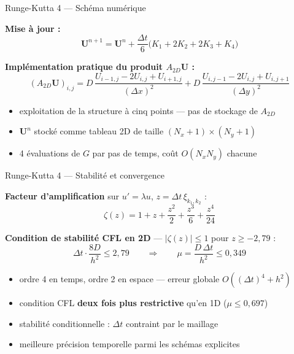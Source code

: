 \documentclass[10pt]{beamer}
\begin{document}
\begin{frame}{Runge-Kutta 4 — Schéma numérique}

\textbf{Mise à jour :}
\begin{equation}
  \boxed{\mathbf{U}^{n+1} = \mathbf{U}^n
    + \frac{\Delta t}{6}\bigl(K_1 + 2K_2 + 2K_3 + K_4\bigr)}
\end{equation}

\bigskip

\textbf{Implémentation pratique du produit $A_{2D}\mathbf{U}$ :}
\begin{equation}
  (A_{2D}\mathbf{U})_{i,j} =
  D\,\frac{U_{i-1,j} - 2U_{i,j} + U_{i+1,j}}{(\Delta x)^2}
  + D\,\frac{U_{i,j-1} - 2U_{i,j} + U_{i,j+1}}{(\Delta y)^2}
\end{equation}

\medskip

\begin{itemize}
  \item exploitation de la structure à cinq points — pas de stockage de $A_{2D}$
  \item $\mathbf{U}^n$ stocké comme tableau 2D de taille $(N_x{+}1)\times(N_y{+}1)$
  \item 4 évaluations de $G$ par pas de temps, coût $O(N_x N_y)$ chacune
\end{itemize}

\end{frame}

\begin{frame}{Runge-Kutta 4 — Stabilité et convergence}

\textbf{Facteur d'amplification} sur $u' = \lambda u$, $z = \Delta t\,\xi_{k_1,k_2}$ :
\begin{equation}
  \zeta(z) = 1 + z + \frac{z^2}{2} + \frac{z^3}{6} + \frac{z^4}{24}
\end{equation}

\bigskip

\textbf{Condition de stabilité CFL en 2D} — $|\zeta(z)| \leq 1$ pour $z \geq -2{,}79$ :
\begin{equation}
  \Delta t \cdot \frac{8D}{h^2} \leq 2{,}79
  \qquad \Longrightarrow \qquad
  \boxed{\mu = \frac{D\,\Delta t}{h^2} \leq 0{,}349}
\end{equation}

\bigskip

\begin{itemize}
  \item ordre 4 en temps, ordre 2 en espace — erreur globale $O((\Delta t)^4 + h^2)$
  \item condition CFL \textbf{deux fois plus restrictive} qu'en 1D ($\mu \leq 0{,}697$)
  \item stabilité conditionnelle : $\Delta t$ contraint par le maillage
  \item meilleure précision temporelle parmi les schémas explicites
\end{itemize}

\end{frame}
\end{document}

